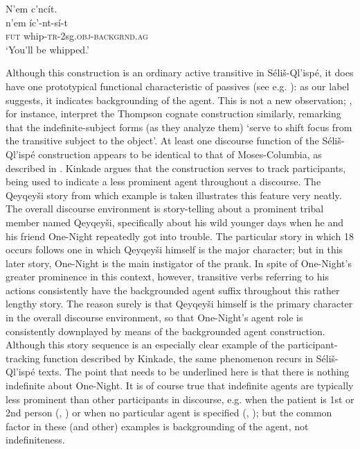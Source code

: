 \documentclass[output=paper,colorlinks,citecolor=brown]{langscibook}
\begin{document}
\ea 
\label{ex-thomason-23}
N'em {\textltilde}c'nc\'it. \\
\gll n'em \textltilde\'ic'-nt-s\'i-t\\ 
\textsc{fut} whip-\textsc{tr}-2sg.\textsc{obj-backgrnd.ag}\\
\glt  `You'll be whipped.'
\z


Although this construction is an ordinary active transitive in
S\'eli\v{s}-Ql'isp\'e, it does have one prototypical functional
characteristic of passives (see e.g. \citealt{Shibatani:1985}): as our label
suggests, it indicates backgrounding of the agent.  This is not a new
observation; \citet[58]{Thompson&Thompson:1992}, for instance, interpret
the Thompson cognate construction similarly, remarking that the
indefinite-subject forms (as they analyze them) `serve to shift focus
from the transitive subject to the object'.  At least one discourse
function of the S\'eli\v{s}-Ql'isp\'e construction appears to be
identical to that of Moses-Columbia, as described in .
Kinkade argues that the construction serves to track participants,
being used to indicate a less prominent agent throughout a discourse.
The Qeyqey\v{s}i story from which example   is taken illustrates this
feature very neatly.  The overall discourse environment is
story-telling about a prominent tribal member named Qeyqey\v{s}i,
specifically about his wild younger days when he and his friend
One-Night repeatedly got into trouble.  The particular story in which
18 occurs follows one in which Qeyqey\v{s}i himself is the major
character; but in this later story, One-Night is the main instigator
of the prank.  In spite of One-Night's greater prominence in this
context, however, transitive verbs referring to his actions
consistently have the backgrounded agent suffix throughout this rather
lengthy story.  The reason surely is that Qeyqey\v{s}i himself is the
primary character in the overall discourse environment, so that
One-Night's agent role is consistently downplayed by means of the
backgrounded agent construction.  Although this story sequence is an
especially clear example of the participant-tracking function
described by Kinkade, the same phenomenon recurs in
S\'eli\v{s}-Ql'isp\'e texts.  The point that needs to be underlined
here is that there is nothing indefinite about One-Night.  It is of
course true that indefinite agents are typically less prominent than
other participants in discourse, e.g.  when the patient is 1st or 2nd
person (, ) or when no particular agent is specified (, ); but
the common factor in these (and other) examples is backgrounding of
the agent, not indefiniteness.
\end{document}
